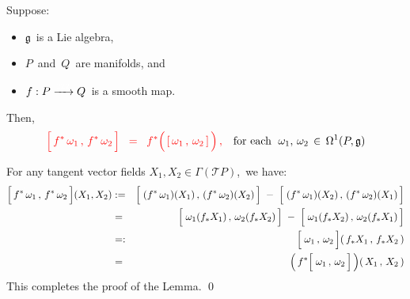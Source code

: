 \vskip 0.5cm
\begin{lemma}
\label{PullbacksPreserveBrackets}
\mbox{}
\vskip 0.1cm
\noindent
Suppose:
\begin{itemize}
\item
	\vskip -0.2cm
	$\mathfrak{g}$\, is a Lie algebra,
\item
	$P$\, and \,$Q$\, are {\color{red}manifolds}, and
\item
	$f : P \xrightarrow{{\color{white}222}} Q$\, is a smooth map.
\end{itemize}
Then,
\begin{equation*}
{\color{red}
\left[\,\overset{{\color{white}.}}{f^{*}\,\omega_{1}}\,,\,f^{*}\,\omega_{2}\,\right]
\;\; = \;\;
	f^{*}\!\left(\,
		\overset{{\color{white}.}}{
			\left[\,\omega_{1}\,,\,\omega_{2}\,\right]
			}
		\,\right),
}
\quad
\textnormal{for each \;$\omega_{1},\, \omega_{2} \,\in\, \Omega^{1}(P,\mathfrak{g})$}
\end{equation*}
\end{lemma}
\proof
For any tangent vector fields $X_{1}, X_{2} \in \Gamma(\mathcal{T}P)$,\, we have:
\begin{eqnarray*}
\left[\,\overset{{\color{white}.}}{f^{*}\,\omega_{1}}\,,\,f^{*}\,\omega_{2}\,\right]\!(X_{1},X_{2})
& := &
	\left[\;
		(\overset{{\color{white}.}}{f^{*}\,\omega_{1}})(X_{1})
		\,,\,
		(f^{*}\,\omega_{2})(X_{2})
		\,\right]
	\; - \;
	\left[\;
		(\overset{{\color{white}.}}{f^{*}\,\omega_{1}})(X_{2})
		\,,\,
		(f^{*}\,\omega_{2})(X_{1})
		\,\right]
\\
& = &
	\left[\;
		\omega_{1}(\overset{{\color{white}.}}{f_{*}X_{1}})
		\,,\,
		\omega_{2}(f_{*}X_{2})
		\,\right]
	\; - \;
	\left[\;
		\omega_{1}(\overset{{\color{white}.}}{f_{*}X_{2}})
		\,,\,
		\omega_{2}(f_{*}X_{1})
		\,\right]
\\
& =: &
	\left[\;
		\overset{{\color{white}1}}{\omega_{1}}
		\,,\,
		\omega_{2}
		\,\right]\!
	(\, f_{*}X_{1} \,,\, f_{*}X_{2} \,)
\\
& = &
	\left(\,f^{*}\!\left[\;
		\overset{{\color{white}1}}{\omega_{1}}
		\,,\,
		\omega_{2}
		\,\right]\,\right)\!
	(\, X_{1} \,,\, X_{2} \,)
\end{eqnarray*}
This completes the proof of the Lemma.
\qed

